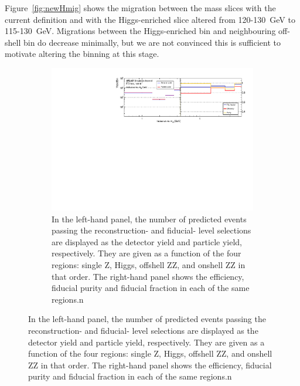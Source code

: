 Figure~\ref{fig:newHmig} shows the migration between the \mFourL mass slices with the current definition and with the Higgs-enriched slice altered from 120-130~GeV to 115-130~GeV. Migrations between the Higgs-enriched bin and neighbouring off-shell bin do decrease minimally, but we are not convinced this is sufficient to motivate altering the binning at this stage.
\begin{figure}[htb!]
    \begin{subfigure}{.99\textwidth}\centering
      \includegraphics[width=.99\linewidth]{Figures/m4l/UnfoldingStudies/v014_inputs/inclusive_vs_m4linputs.pdf}  
      \caption{In the left-hand panel, the number of predicted events passing the reconstruction- and fiducial- level selections are displayed as the detector yield and particle yield, respectively. They are given as a function of the four \mFourL regions: single Z, Higgs,  offshell ZZ, and onshell ZZ in that order. The right-hand panel shows the efficiency, fiducial purity and fiducial fraction in each of the same \mFourL regions.n}
      \label{fig:inclvm4lunf}
    \end{subfigure}
\end{figure}

